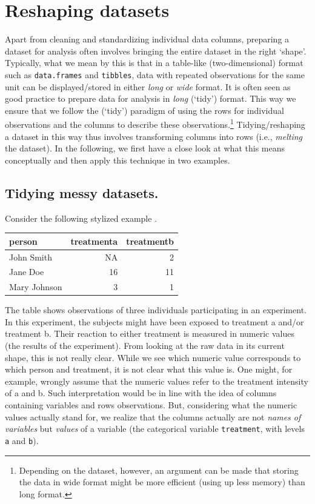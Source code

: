 \documentclass[
  12pt,
]{style/krantz}
\begin{document}
\hypertarget{reshaping-datasets}{%
\section{Reshaping datasets}\label{reshaping-datasets}}

Apart from cleaning and standardizing individual data columns, preparing a dataset for analysis often involves bringing the entire dataset in the right `shape'. Typically, what we mean by this is that in a table-like (two-dimensional) format such as \texttt{data.frames} and \texttt{tibbles}, data with repeated observations for the same unit can be displayed/stored in either \emph{long} or \emph{wide} format. It is often seen as good practice to prepare data for analysis in \emph{long} (`tidy') format. This way we ensure that we follow the (`tidy') paradigm of using the rows for individual observations and the columns to describe these observations.\footnote{Depending on the dataset, however, an argument can be made that storing the data in wide format might be more efficient (using up less memory) than long format.} Tidying/reshaping a dataset in this way thus involves transforming columns into rows (i.e., \emph{melting} the dataset). In the following, we first have a close look at what this means conceptually and then apply this technique in two examples.

\hypertarget{tidying-messy-datasets.}{%
\subsection{Tidying messy datasets.}\label{tidying-messy-datasets.}}

Consider the following stylized example \citep{wickham_2014}.

\begin{tabular}{l|r|r}
\hline
person & treatmenta & treatmentb\\
\hline
John Smith & NA & 2\\
\hline
Jane Doe & 16 & 11\\
\hline
Mary Johnson & 3 & 1\\
\hline
\end{tabular}

The table shows observations of three individuals participating in an experiment. In this experiment, the subjects might have been exposed to treatment a and/or treatment b. Their reaction to either treatment is measured in numeric values (the results of the experiment). From looking at the raw data in its current shape, this is not really clear. While we see which numeric value corresponds to which person and treatment, it is not clear what this value is. One might, for example, wrongly assume that the numeric values refer to the treatment intensity of a and b. Such interpretation would be in line with the idea of columns containing variables and rows observations. But, considering what the numeric values actually stand for, we realize that the columns actually are not \emph{names of variables} but \emph{values} of a variable (the categorical variable \texttt{treatment}, with levels \texttt{a} and \texttt{b}).
\end{document}
